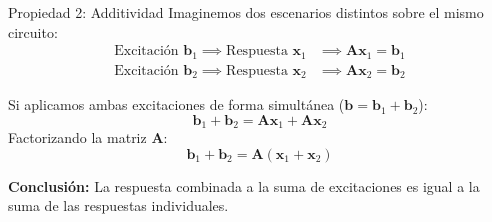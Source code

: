 \documentclass[aspectratio=169, table, xcdraw]{beamer}
\begin{document}
\begin{frame}{Propiedad 2: Additividad}
    Imaginemos dos escenarios distintos sobre el mismo circuito:
    \begin{align*}
        \text{Excitación } \bm{b}_1 \implies \text{Respuesta } \bm{x}_1 &\implies \bm{A} \bm{x}_1 = \bm{b}_1 \\
        \text{Excitación } \bm{b}_2 \implies \text{Respuesta } \bm{x}_2 &\implies \bm{A} \bm{x}_2 = \bm{b}_2
    \end{align*}
    
    Si aplicamos ambas excitaciones de forma simultánea ($\bm{b} = \bm{b}_1 + \bm{b}_2$):
    \begin{equation*}
        \bm{b}_1 + \bm{b}_2 = \bm{A} \bm{x}_1 + \bm{A} \bm{x}_2
    \end{equation*}
    Factorizando la matriz $\bm{A}$:
    \begin{equation*}
        \bm{b}_1 + \bm{b}_2 = \bm{A} (\bm{x}_1 + \bm{x}_2)
    \end{equation*}
    
    \textbf{Conclusión:} La respuesta combinada a la suma de excitaciones es igual a la suma de las respuestas individuales.
\end{frame}
\end{document}
